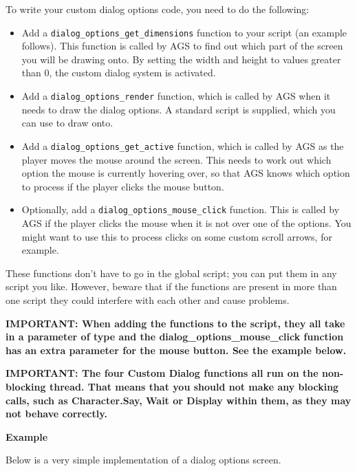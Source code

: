 To write your custom dialog options code, you need to do the following:
\begin{itemize}
\item Add a \verb$dialog_options_get_dimensions$ function to your script (an example follows).
This function is called by AGS to find out which part of the screen you will be drawing onto.
By setting the width and height to values greater than 0, the custom dialog system is activated.
\item Add a \verb$dialog_options_render$ function, which is called by AGS when it needs to
draw the dialog options. A standard script  is
supplied, which you can use to draw onto.
\item Add a \verb$dialog_options_get_active$ function, which is called by AGS as the player moves
the mouse around the screen. This needs to work out which option the mouse is currently hovering
over, so that AGS knows which option to process if the player clicks the mouse button.
\item Optionally, add a \verb$dialog_options_mouse_click$ function. This is called by AGS if the
player clicks the mouse when it is not over one of the options. You might want to use this to
process clicks on some custom scroll arrows, for example.
\end{itemize}
These functions don't have to go in the global script; you can put them in any script you like.
However, beware that if the functions are present in more than one script they could interfere
with each other and cause problems.

\bf{IMPORTANT:} When adding the functions to the script, they all take in a parameter of
type  and the
dialog_options_mouse_click function has an extra parameter for the mouse button. See the example below.

\bf{IMPORTANT:} The four Custom Dialog functions all run on the non-blocking thread. That means
that you should not make any blocking calls, such as Character.Say, Wait or Display within them,
as they may not behave correctly.

\bf{Example}

Below is a very simple implementation of a dialog options screen.

